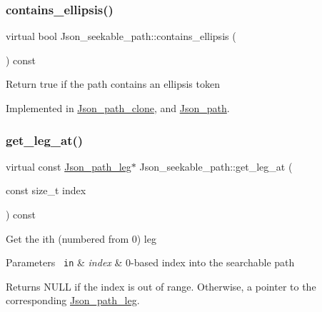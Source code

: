 \subsubsection{\texorpdfstring{contains\+\_\+ellipsis()}{contains\_ellipsis()}}
{\footnotesize\ttfamily virtual bool Json\+\_\+seekable\+\_\+path\+::contains\+\_\+ellipsis (\begin{DoxyParamCaption}{ }\end{DoxyParamCaption}) const\hspace{0.3cm}{\ttfamily [pure virtual]}}

Return true if the path contains an ellipsis token 

Implemented in \mbox{\hyperlink{classJson__path__clone_ab1c40c5424e17ba7dddaf168c36fbced}{Json\+\_\+path\+\_\+clone}}, and \mbox{\hyperlink{classJson__path_a6f1be7ddf18da788f48e031a7b65c5f3}{Json\+\_\+path}}.

\mbox{\label{classJson__seekable__path_a590e675762b99402555d555fb99ffa4f}} 
\subsubsection{\texorpdfstring{get\+\_\+leg\+\_\+at()}{get\_leg\_at()}}
{\footnotesize\ttfamily virtual const \mbox{\hyperlink{classJson__path__leg}{Json\+\_\+path\+\_\+leg}}$\ast$ Json\+\_\+seekable\+\_\+path\+::get\+\_\+leg\+\_\+at (\begin{DoxyParamCaption}\item[{const size\+\_\+t}]{index }\end{DoxyParamCaption}) const\hspace{0.3cm}{\ttfamily [pure virtual]}}

Get the ith (numbered from 0) leg


\begin{DoxyParams}[1]{Parameters}
\mbox{\texttt{ in}}  & {\em index} & 0-\/based index into the searchable path\\
\hline
\end{DoxyParams}
\begin{DoxyReturn}{Returns}
N\+U\+LL if the index is out of range. Otherwise, a pointer to the corresponding \mbox{\hyperlink{classJson__path__leg}{Json\+\_\+path\+\_\+leg}}. 
\end{DoxyReturn}


